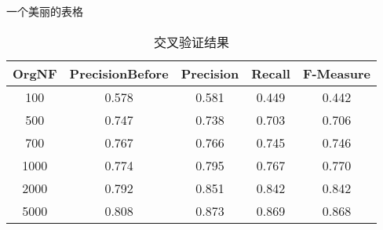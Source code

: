 \documentclass[UTF-8]{beamer}
\begin{document}
        \begin{frame}{一个美丽的表格}
        \begin{table}[htbp]
            \caption{交叉验证结果}
            \centering
                \begin{tabular}{ccccc}
                    \toprule
                    OrgNF   &  PrecisionBefore  & Precision &   Recall & F-Measure \\  
                    \midrule
                    100 &  0.578 & 0.581 &   0.449   &  0.442 \\
                    500 &  0.747 & 0.738 &   0.703   &  0.706 \\
                    700 &  0.767 & 0.766 &   0.745   &  0.746 \\
                    1000 & 0.774 & 0.795 &   0.767   &  0.770  \\
                    2000 & 0.792 & 0.851 &   0.842   &  0.842 \\
                    5000 & 0.808 & 0.873 &   0.869   &  0.868 \\
                    \bottomrule
                \end{tabular}
        \end{table}
    
        \end{frame}
    
    
\end{document}
